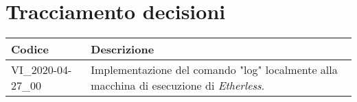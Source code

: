 \section{Tracciamento decisioni}
\renewcommand{\arraystretch}{1.8}

\begin{longtable}{|p{5cm}|p{8cm}|}
	\hline
	
	\rowcolor{header}
	\textbf{Codice} &  \textbf{Descrizione}\\
	
	\hline
	
	VI\_2020-04-27\_00 & Implementazione del comando "log" localmente alla macchina di esecuzione di \textit{Etherless}.\\
	\hline
\end{longtable}
